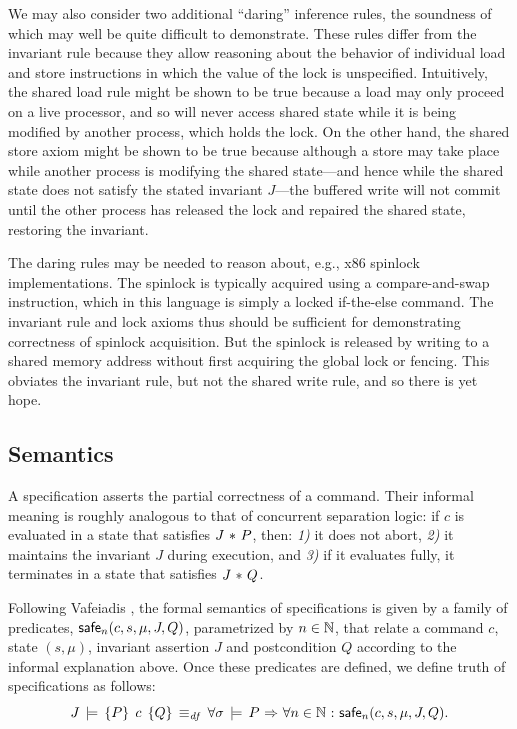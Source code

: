 \documentclass[11pt]{report}
\begin{document}
We may also consider two additional ``daring'' inference rules, the soundness of which may well be quite difficult to demonstrate. 
These rules differ from the invariant rule because they allow reasoning about the behavior of individual load and store instructions in which the value of the lock is unspecified. Intuitively, the shared load rule might be shown to be true because a load may only proceed on a live processor, and so will never access shared state while it is being modified by another process, which holds the lock. On the other hand, the shared store axiom might be shown to be true because although a store may take place while another process is modifying the shared state---and hence while the shared state does not satisfy the stated invariant $J$---the buffered write will not commit until the other process has released the lock and repaired the shared state, restoring the invariant.

The daring rules may be needed to reason about, e.g., x86 spinlock implementations. The spinlock is typically acquired using a compare-and-swap instruction, which in this language is simply a locked if-the-else command. The invariant rule and lock axioms thus should be sufficient for demonstrating correctness of spinlock acquisition. But the spinlock is released by writing to a shared memory address without first acquiring the global lock or fencing. This obviates the invariant rule, but not the shared write rule, and so there is yet hope. 

\subsection{Semantics}
\label{sec:specification-semantics}

A specification asserts the partial correctness of a command. Their informal meaning is roughly analogous to that of concurrent separation logic: if $c$ is evaluated in a state that satisfies $J \operatorname{\,\ast\,} P$, then: \emph{1)} it does not abort, \emph{2)} it maintains the invariant $J$ during execution, and \emph{3)} if it evaluates fully, it terminates in a state that satisfies $J \operatorname{\,\ast\,} Q$. 

Following Vafeiadis \cite{V11}, the formal semantics of specifications is given by a family of predicates, $\mathsf{safe}_{n}(c,s,\mu,J,Q)$, parametrized by $n \in \mathbb{N}$, that relate a command $c$, state $(s,\mu)$, invariant assertion $J$ and postcondition $Q$ according to the informal explanation above. Once these predicates are defined, we define truth of specifications as follows: \[ J\,\models\,\left\lbrace P \right\rbrace\;c\;\left\lbrace Q \right\rbrace \operatorname{\;\equiv_{\mathit{df}}\;} \forall \sigma \,\models\, P \operatorname{\,\Rightarrow\,} \forall n \in \mathbb{N} \operatorname{\,:\,} \mathsf{safe}_{n}(c,s,\mu,J,Q).\]
\end{document}

